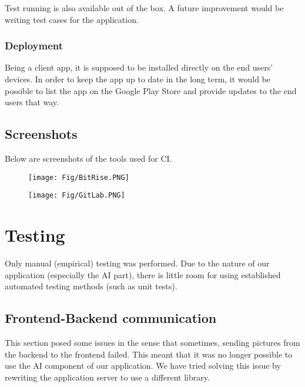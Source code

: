 \documentclass[runningheads,a4paper,11pt]{report}
\begin{document}
Test running is also available out of the box. A future improvement would be writing test cases for the application.

\subsubsection{Deployment}

Being a client app, it is supposed to be installed directly on the end users' devices. In order to keep the app up to date in the long term, it would be possible to list the app on the Google Play Store and provide updates to the end users that way.

\subsection{Screenshots}

Below are screenshots of the tools used for CI.

\begin{figure}[htbp]
\centering
\begin{minipage}{1\textwidth}
  \centering
  \texttt{[image: Fig/BitRise.PNG]}
  \label{fig:userInterface1}
  
  \texttt{[image: Fig/GitLab.PNG]}
  \label{fig:userInterface2}
\end{minipage}
\end{figure}

\section{Testing}

Only manual (empirical) testing was performed. Due to the nature of our application (especially the AI part), there is little room for using established automated testing methods (such as unit tests).

\subsection{Frontend-Backend communication}

This section posed some issues in the sense that sometimes, sending pictures from the backend to the frontend failed. This meant that it was no longer possible to use the AI component of our application. We have tried solving this issue by rewriting the application server to use a different library.
\end{document}

